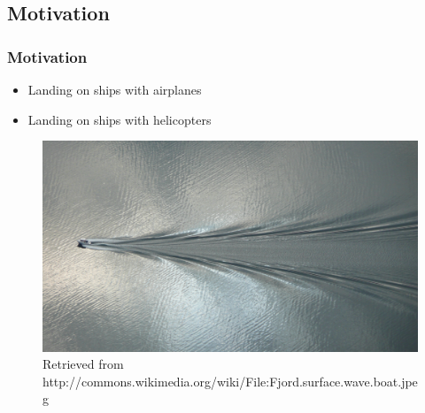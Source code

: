 \subsection{Motivation}

\begin{frame}
\frametitle{Motivation}

\begin{itemize}[<+(1)->]
\item Landing on ships with airplanes
\item Landing on ships with helicopters
\end{itemize}

\begin{figure}
\centering
\includegraphics[width=.8\textwidth]{Images/Attribute/Wake/Fjord_surface_wave_boat}
\caption{Retrieved from http://commons.wikimedia.org/wiki/File:Fjord.surface.wave.boat.jpeg}
\end{figure}

\end{frame}
